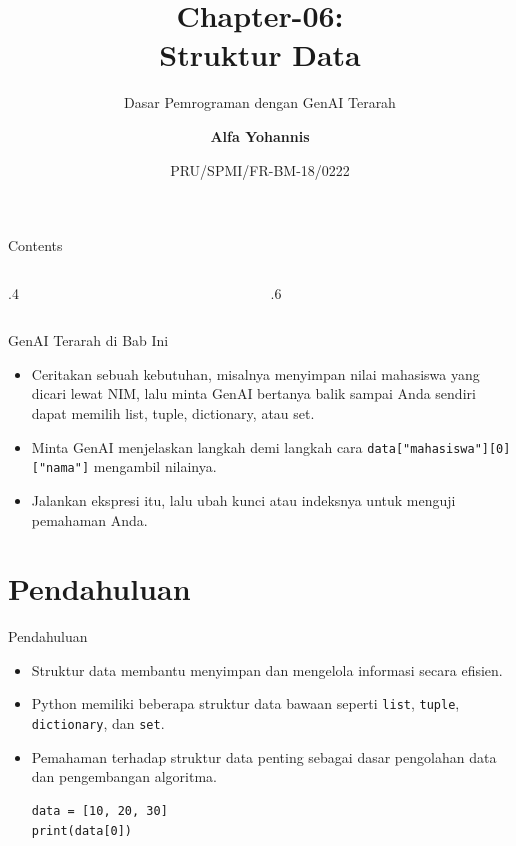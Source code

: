 \documentclass[aspectratio=169, table]{beamer}
\subtitle{Dasar Pemrograman dengan GenAI Terarah}
\title{Chapter-06:\\\LARGE{Struktur Data\\}
\vspace{10pt}}
\date[Serial]{\scriptsize {PRU/SPMI/FR-BM-18/0222}}
\author[Pradita]{\small{\textbf{Alfa Yohannis}}}
\begin{document}
\frame{\titlepage}

\begin{frame}[fragile]{Contents}
\vspace{15pt}
\begin{columns}[t]
\begin{column}{.4\textwidth}
\tableofcontents[sections={1-7}]
\end{column}
\begin{column}{.6\textwidth}
\tableofcontents[sections={8-14}]
\end{column}
\end{columns}
\end{frame}


\begin{frame}{GenAI Terarah di Bab Ini}
\small
\begin{itemize}
  \item Ceritakan sebuah kebutuhan, misalnya menyimpan nilai mahasiswa yang dicari lewat NIM, lalu minta GenAI bertanya balik sampai Anda sendiri dapat memilih list, tuple, dictionary, atau set.
  \item Minta GenAI menjelaskan langkah demi langkah cara \texttt{data["mahasiswa"][0]["nama"]} mengambil nilainya.
  \item Jalankan ekspresi itu, lalu ubah kunci atau indeksnya untuk menguji pemahaman Anda.
\end{itemize}
\end{frame}

\section{Pendahuluan}


\begin{frame}[fragile]{Pendahuluan}
\vspace{20pt}

\begin{itemize}
  \item Struktur data membantu menyimpan dan mengelola informasi secara efisien. 
  \item Python memiliki beberapa struktur data bawaan seperti 
        \texttt{list}, \texttt{tuple}, \texttt{dictionary}, dan \texttt{set}. 
  \item Pemahaman terhadap struktur data penting sebagai dasar pengolahan data 
        dan pengembangan algoritma.
	\begin{lstlisting}[style=PythonStyle]
data = [10, 20, 30]
print(data[0])
\end{lstlisting}
\end{itemize}


\end{frame}
\end{document}
